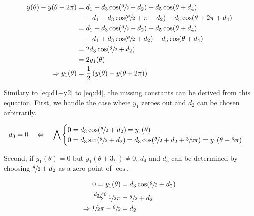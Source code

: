 \begin{equation}
    \label{eq:y1}
    \begin{split}
        y(\theta) - y(\theta + 2\pi)
            &= d_1 + d_3 \cos(\sfrac\theta2 + d_2) + d_5 \cos(\theta + d_4)\\
                &\quad - d_1 - d_3 \cos(\sfrac\theta2 + \pi + d_2) - d_5 \cos(\theta + 2\pi + d_4)\\
            &= d_1 + d_3 \cos(\sfrac\theta2 + d_2) + d_5 \cos(\theta + d_4)\\
                &\quad - d_1 + d_3 \cos(\sfrac\theta2 + d_2) - d_5 \cos(\theta + d_4)\\
            &= 2 d_3 \cos(\sfrac\theta2 + d_2)\\
            &= 2 y_1(\theta)\\
        \Rightarrow y_1(\theta) &= \frac12\left(y(\theta) - y(\theta + 2\pi)\right)
    \end{split}
\end{equation}

Similary to \ref{eq:d1+y2} to \ref{eq:d4}, the missing constants can be derived
from this equation.
First, we handle the case where $y_1$ zeroes out and $d_2$ can be chosen
arbitrarily.

\begin{equation}
    \label{eq:d3-0}
    d_3 = 0 \quad\Leftrightarrow\quad \bigwedge
    \begin{cases}
        0 = d_3 \cos(\sfrac\theta2 + d_2) = y_1(\theta) \\
        0 = d_3 \sin(\sfrac\theta2 + d_2) = d_3 \cos(\sfrac\theta2 + d_2 + \sfrac32\pi) = y_1(\theta + 3\pi)
    \end{cases}
\end{equation}

Second, if $y_1(\theta) = 0$ but $y_1(\theta + 3\pi) \neq 0$, $d_4$ and $d_5$ can
be determined by choosing $\sfrac\theta2 + d_2$ as a zero point of $\cos$.

\begin{equation}
    \label{eq:whateverman-the-second}
    \begin{split}
        0 = y_1(\theta) &= d_3 \cos(\sfrac\theta2 + d_2)\\
        \stackrel{d_3 \neq 0}\Rightarrow \sfrac12\pi &= \sfrac\theta2 + d_2\\
        \Rightarrow \sfrac12\pi - \sfrac\theta2 &= d_2
    \end{split}
\end{equation}


